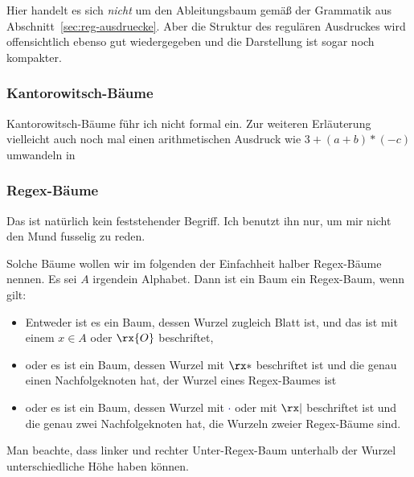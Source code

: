Hier handelt es sich \emph{nicht} um den Ableitungsbaum gemäß der
Grammatik aus Abschnitt~\ref{sec:reg-ausdruecke}. Aber die Struktur
des regulären Ausdruckes wird offensichtlich ebenso gut wiedergegeben
und die Darstellung ist sogar noch kompakter.
%
\begin{tutorium}
  \subsubsection*{Kantorowitsch-Bäume}
  Kantorowitsch-Bäume führ ich nicht formal ein. Zur weiteren
  Erläuterung vielleicht auch noch mal einen arithmetischen Ausdruck
  wie $3+(a+b)*(-c)$ umwandeln in

  \begin{center}
  \end{center}
\end{tutorium}

\begin{tutorium}
  \subsubsection*{Regex-Bäume}
  Das ist natürlich kein feststehender Begriff. Ich benutzt ihn nur, um
  mir nicht den Mund fusselig zu reden.
\end{tutorium}
Solche Bäume wollen wir im folgenden der Einfachheit halber
Regex-Bäume nennen.  Es sei $A$ irgendein Alphabet. Dann ist
ein Baum ein Regex-Baum, wenn gilt:
\begin{itemize}
\item Entweder ist es ein Baum, dessen Wurzel zugleich Blatt ist, und
  das ist mit einem $x\in A$ oder $\rx{O}$ beschriftet,
\item oder es ist ein Baum, dessen Wurzel mit $\rx*$ beschriftet ist
  und die genau einen Nachfolgeknoten hat, der Wurzel eines
  Regex-Baumes ist
\item oder es ist ein Baum, dessen Wurzel mit
  \textcolor{darkblue}{$\cdot$} oder mit $\rx|$ beschriftet ist und
  die genau zwei Nachfolgeknoten hat, die Wurzeln zweier Regex-Bäume
  sind.
\end{itemize}
%
Man beachte, dass linker und rechter Unter-Regex-Baum unterhalb der
Wurzel unterschiedliche Höhe haben können.

